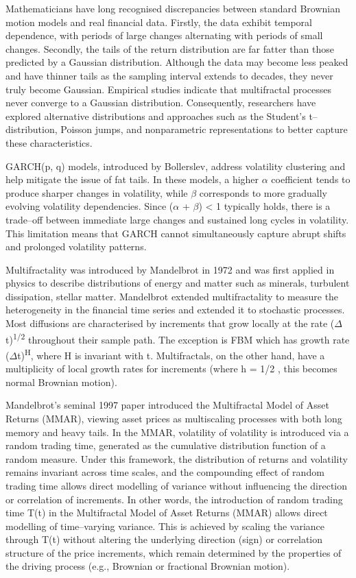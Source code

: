 \documentclass[12pt,a4paper]{report}
\numberwithin{equation}{section}
\begin{document}
Mathematicians have long recognised discrepancies between standard
Brownian motion models and real financial data. Firstly, the data
exhibit temporal dependence, with periods of large changes alternating
with periods of small changes. Secondly, the tails of the return
distribution are far fatter than those predicted by a Gaussian
distribution. Although the data may become less peaked and have thinner
tails as the sampling interval extends to decades, they never truly
become Gaussian. Empirical studies indicate that multifractal processes
never converge to a Gaussian distribution. Consequently, researchers
have explored alternative distributions and approaches such as the
Student's t--distribution, Poisson jumps, and nonparametric
representations to better capture these characteristics.

GARCH(p, q) models, introduced by Bollerslev, address volatility
clustering and help mitigate the issue of fat tails. In these models, a
higher $\alpha$ coefficient tends to produce sharper changes in volatility,
while $\beta$ corresponds to more gradually evolving volatility dependencies.
Since ($\alpha$ + $\beta$) \textless{} 1 typically holds, there is a trade--off
between immediate large changes and sustained long cycles in volatility.
This limitation means that GARCH cannot simultaneously capture abrupt
shifts and prolonged volatility patterns.

Multifractality was introduced by Mandelbrot in 1972 and was first
applied in physics to describe distributions of energy and matter such
as minerals, turbulent dissipation, stellar matter. Mandelbrot extended
multifractality to measure the heterogeneity in the financial time
series and extended it to stochastic processes. Most diffusions are
characterised by increments that grow locally at the rate
($\Delta$t)\textsuperscript{1/2} throughout their sample path. The exception
is FBM which has growth rate ($\Delta$t)\textsuperscript{H}, where H is
invariant with t. Multifractals, on the other hand, have a multiplicity
of local growth rates for increments (where h = 1/2 , this becomes
normal Brownian motion).

Mandelbrot's seminal 1997 paper introduced the Multifractal Model of
Asset Returns (MMAR), viewing asset prices as multiscaling processes
with both long memory and heavy tails. In the MMAR, volatility of
volatility is introduced via a random trading time, generated as the
cumulative distribution function of a random measure. Under this
framework, the distribution of returns and volatility remains invariant
across time scales, and the compounding effect of random trading time
allows direct modelling of variance without influencing the direction or
correlation of increments. In other words, the introduction of random
trading time T(t) in the Multifractal Model of Asset Returns (MMAR)
allows direct modelling of time--varying variance. This is achieved by
scaling the variance through T(t) without altering the underlying
direction (sign) or correlation structure of the price increments, which
remain determined by the properties of the driving process (e.g.,
Brownian or fractional Brownian motion).
\end{document}
